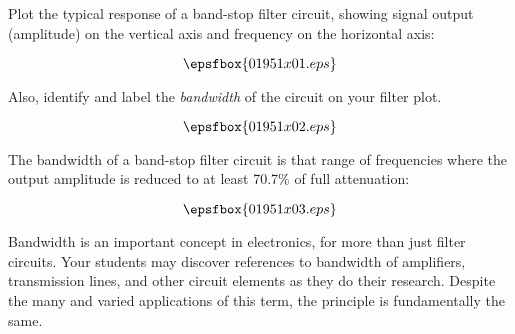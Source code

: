 

Plot the typical response of a band-stop filter circuit, showing signal output (amplitude) on the vertical axis and frequency on the horizontal axis:

$$\epsfbox{01951x01.eps}$$

Also, identify and label the {\it bandwidth} of the circuit on your filter plot.







$$\epsfbox{01951x02.eps}$$

The bandwidth of a band-stop filter circuit is that range of frequencies where the output amplitude is reduced to at least 70.7\% of full attenuation:

$$\epsfbox{01951x03.eps}$$







Bandwidth is an important concept in electronics, for more than just filter circuits.  Your students may discover references to bandwidth of amplifiers, transmission lines, and other circuit elements as they do their research.  Despite the many and varied applications of this term, the principle is fundamentally the same.




